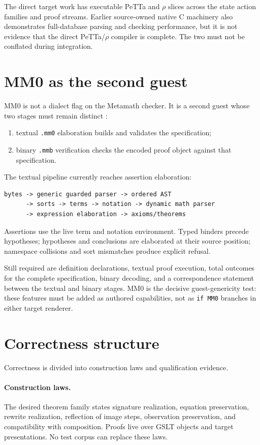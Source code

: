 \documentclass[11pt]{article}
\theoremstyle{remark}
\newcommand{\code}[1]{\texttt{#1}}
\begin{document}
The direct target work has executable PeTTa and $\rho$ slices across the state
action families and proof streams.  Earlier source-owned native C machinery
also demonstrates full-database parsing and checking performance, but it is
not evidence that the direct PeTTa/$\rho$ compiler is complete.  The two must
not be conflated during integration.

\section{MM0 as the second guest}

MM0 is not a dialect flag on the Metamath checker.  It is a second guest whose
two stages must remain distinct \cite{Carneiro2020}:
\begin{enumerate}
\item textual \code{.mm0} elaboration builds and validates the specification;
\item binary \code{.mmb} verification checks the encoded proof object against
      that specification.
\end{enumerate}

The textual pipeline currently reaches assertion elaboration:
\begin{lstlisting}
bytes -> generic guarded parser -> ordered AST
      -> sorts -> terms -> notation -> dynamic math parser
      -> expression elaboration -> axioms/theorems
\end{lstlisting}
Assertions use the live term and notation environment.  Typed binders precede
hypotheses; hypotheses and conclusions are elaborated at their source
position; namespace collisions and sort mismatches produce explicit refusal.

Still required are definition declarations, textual proof execution, total
outcomes for the complete specification, binary decoding, and a correspondence
statement between the textual and binary stages.  MM0 is the decisive
guest-genericity test: these features must be added as authored capabilities,
not as \code{if MM0} branches in either target renderer.

\section{Correctness structure}

Correctness is divided into construction laws and qualification evidence.

\paragraph{Construction laws.}
The desired theorem family states signature realization, equation
preservation, rewrite realization, reflection of image steps, observation
preservation, and compatibility with composition.  Proofs live over GSLT
objects and target presentations.  No test corpus can replace these laws.
\end{document}
